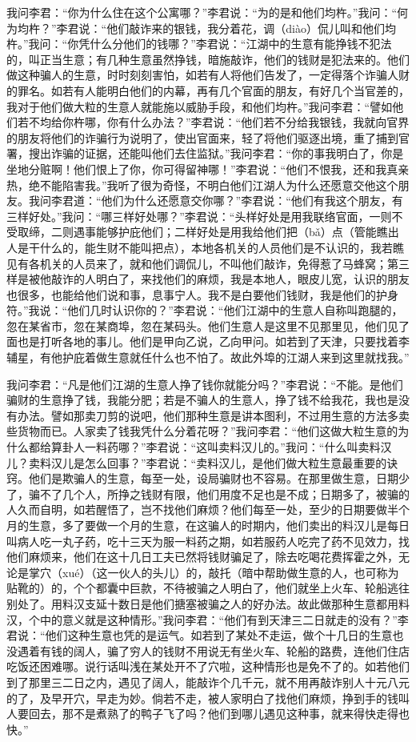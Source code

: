 \documentclass[12pt,UTF8]{ctexbook}
\begin{document}
我问李君：“你为什么住在这个公寓哪？”李君说：“为的是和他们均杵。”我问：“何为均杵？”李君说：“他们敲诈来的银钱，我分着花，调（diào）侃儿叫和他们均杵。”我问：“你凭什么分他们的钱哪？”李君说：“江湖中的生意有能挣钱不犯法的，叫正当生意；有几种生意虽然挣钱，暗施敲诈，他们的钱财是犯法来的。他们做这种骗人的生意，时时刻刻害怕，如若有人将他们告发了，一定得落个诈骗人财的罪名。如若有人能明白他们的内幕，再有几个官面的朋友，有好几个当官差的，我对于他们做大粒的生意人就能施以威胁手段，和他们均杵。”我问李君：“譬如他们若不均给你杵哪，你有什么办法？”李君说：“他们若不分给我银钱，我就向官界的朋友将他们的诈骗行为说明了，使出官面来，轻了将他们驱逐出境，重了捕到官署，搜出诈骗的证据，还能叫他们去住监狱。”我问李君：“你的事我明白了，你是坐地分赃啊！他们恨上了你，你可得留神哪！”李君说：“他们不恨我，还和我真亲热，绝不能陷害我。”我听了很为奇怪，不明白他们江湖人为什么还愿意交他这个朋友。我问李君道：“他们为什么还愿意交你哪？”李君说：“他们有我这个朋友，有三样好处。”我问：“哪三样好处哪？”李君说：“头样好处是用我联络官面，一则不受取缔，二则遇事能够护庇他们；二样好处是用我给他们把（bǎ）点（管能瞧出人是干什么的，能生财不能叫把点），本地各机关的人员他们是不认识的，我若瞧见有各机关的人员来了，就和他们调侃儿，不叫他们敲诈，免得惹了马蜂窝；第三样是被他敲诈的人明白了，来找他们的麻烦，我是本地人，眼皮儿宽，认识的朋友也很多，也能给他们说和事，息事宁人。我不是白要他们钱财，我是他们的护身符。”我说：“他们几时认识你的？”李君说：“他们江湖中的生意人自称叫跑腿的，忽在某省市，忽在某商埠，忽在某码头。他们生意人是这里不见那里见，他们见了面也是打听各地的事儿。他们是甲向乙说，乙向甲问。如若到了天津，只要找着李辅星，有他护庇着做生意就任什么也不怕了。故此外埠的江湖人来到这里就找我。”

我问李君：“凡是他们江湖的生意人挣了钱你就能分吗？”李君说：“不能。是他们骗财的生意挣了钱，我能分肥；若是不骗人的生意人，挣了钱不给我花，我也是没有办法。譬如那卖刀剪的说吧，他们那种生意是讲本图利，不过用生意的方法多卖些货物而已。人家卖了钱我凭什么分着花呀？”我问李君：“他们这做大粒生意的为什么都给算卦人一料药哪？”李君说：“这叫卖料汉儿的。”我问：“什么叫卖料汉儿？卖料汉儿是怎么回事？”李君说：“卖料汉儿，是他们做大粒生意最重要的诀窍。他们是欺骗人的生意，每至一处，设局骗财也不容易。在那里做生意，日期少了，骗不了几个人，所挣之钱财有限，他们用度不足也是不成；日期多了，被骗的人久而自明，如若醒悟了，岂不找他们麻烦？他们每至一处，至少的日期要做半个月的生意，多了要做一个月的生意，在这骗人的时期内，他们卖出的料汉儿是每日叫病人吃一丸子药，吃十三天为服一料药之期，如若服药人吃完了药不见效力，找他们麻烦来，他们在这十几日工夫已然将钱财骗足了，除去吃喝花费挥霍之外，无论是掌穴（xué）（这一伙人的头儿）的，敲托（暗中帮助做生意的人，也可称为贴靴的）的，个个都囊中巨款，不待被骗之人明白了，他们就坐上火车、轮船逃往别处了。用料汉支延十数日是他们搪塞被骗之人的好办法。故此做那种生意都用料汉，个中的意义就是这种情形。”我问李君：“他们有到天津三二日就走的没有？”李君说：“他们这种生意也凭的是运气。如若到了某处不走运，做个十几日的生意也没遇着有钱的阔人，骗了穷人的钱财不用说无有坐火车、轮船的路费，连他们住店吃饭还困难哪。说行话叫浅在某处开不了穴啦，这种情形也是免不了的。如若他们到了那里三二日之内，遇见了阔人，能敲诈个几千元，就不用再敲诈别人十元八元的了，及早开穴，早走为妙。倘若不走，被人家明白了找他们麻烦，挣到手的钱叫人要回去，那不是煮熟了的鸭子飞了吗？他们到哪儿遇见这种事，就来得快走得也快。”
\end{document}
